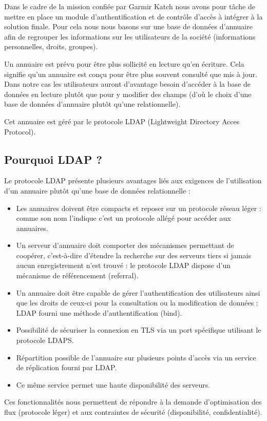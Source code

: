 
Dans le cadre de la mission confiée par Garmir Katch nous avons pour tâche de mettre en place un module d’authentification et de contrôle d’accès à intégrer à la solution finale. Pour cela nous nous basons sur une base de données d’annuaire afin de regrouper les informations sur les utilisateurs de la société (informations personnelles, droits, groupes).

Un annuaire est prévu pour être plus sollicité en lecture qu'en écriture. Cela signifie qu'un annuaire est conçu pour être plus souvent consulté que mis à jour. Dans notre cas les utilisateurs auront d’avantage besoin d’accéder à la base de données en lecture plutôt que pour y modifier des champs (d’où le choix d’une base de données d’annuaire plutôt qu’une relationnelle).

Cet annuaire est géré par le protocole LDAP (Lightweight Directory Acces Protocol).
\subsection{Pourquoi LDAP ?}
Le protocole LDAP présente plusieurs avantages liés aux exigences de l’utilisation d’un annuaire plutôt qu’une base de données relationnelle :
\begin{itemize}
\item Les annuaires doivent être compacts et reposer sur un protocole réseau léger : comme son nom l’indique c’est un protocole allégé pour accéder aux annuaires.
\item Un serveur d'annuaire doit comporter des mécanismes permettant de coopérer, c'est-à-dire d'étendre la recherche sur des serveurs tiers si jamais aucun enregistrement n'est trouvé : le protocole LDAP dispose d’un mécanisme de référencement (referral).
\item Un annuaire doit être capable de gérer l'authentification des utilisateurs ainsi que les droits de ceux-ci pour la consultation ou la modification de données : LDAP fourni une méthode d’authentification (bind).
\item Possibilité de sécuriser la connexion en TLS via un port spécifique utilisant le protocole LDAPS.
\item Répartition possible de l’annuaire sur plusieurs points d’accès via un service de réplication fourni par LDAP.
\item Ce même service permet une haute disponibilité des serveurs.
\end{itemize}
Ces fonctionnalités nous permettent de répondre à la demande d'optimisation des flux (protocole léger) et aux contraintes de sécurité (disponibilité, confidentialité).


